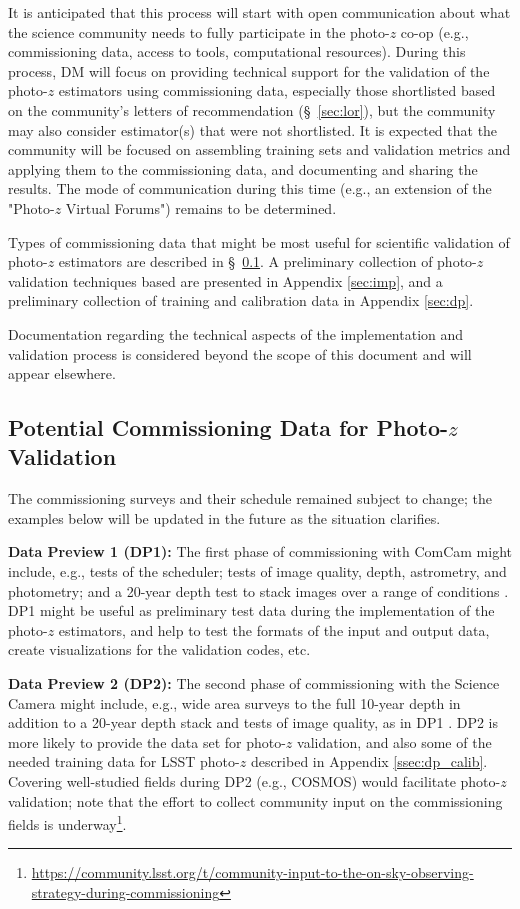 \documentclass[DM,lsstdraft,toc]{lsstdoc}
\begin{document}
It is anticipated that this process will start with open communication about what the science community needs to fully participate in the photo-$z$ co-op (e.g., commissioning data, access to tools, computational resources).
During this process, DM will focus on providing technical support for the validation of the photo-$z$ estimators using commissioning data, especially those shortlisted based on the community's letters of recommendation (\S~\ref{sec:lor}), but the community may also consider estimator(s) that were not shortlisted.
It is expected that the community will be focused on assembling training sets and validation metrics and applying them to the commissioning data, and documenting and sharing the results.
The mode of communication during this time (e.g., an extension of the "Photo-$z$ Virtual Forums") remains to be determined.

Types of commissioning data that might be most useful for scientific validation of photo-$z$ estimators are described in \S~\ref{ssec:pzcoop_commissioning}.
A preliminary collection of photo-$z$ validation techniques based are presented in Appendix \ref{sec:imp}, and a preliminary collection of training and calibration data in Appendix \ref{sec:dp}.

Documentation regarding the technical aspects of the implementation and validation process is considered beyond the scope of this document and will appear elsewhere.

\subsection{Potential Commissioning Data for Photo-$z$ Validation}\label{ssec:pzcoop_commissioning}

The commissioning surveys and their schedule remained subject to change; the examples below will be updated in the future as the situation clarifies.

{\bf Data Preview 1 (DP1):} The first phase of commissioning with ComCam might include, e.g., tests of the scheduler; tests of image quality, depth, astrometry, and photometry; and a 20-year depth test to stack images over a range of conditions .
DP1 might be useful as preliminary test data during the implementation of the photo-$z$ estimators, and help to test the formats of the input and output data, create visualizations for the validation codes, etc.

{\bf Data Preview 2 (DP2):} The second phase of commissioning with the Science Camera might include, e.g., wide area surveys to the full 10-year depth in addition to a 20-year depth stack and tests of image quality, as in DP1 .
DP2 is more likely to provide the data set for photo-$z$ validation, and also some of the needed training data for LSST photo-$z$ described in Appendix \ref{ssec:dp_calib}.
Covering well-studied fields during DP2 (e.g., COSMOS) would facilitate photo-$z$ validation; note that the effort to collect community input on the commissioning fields is underway\footnote{\url{https://community.lsst.org/t/community-input-to-the-on-sky-observing-strategy-during-commissioning}}.
\end{document}
